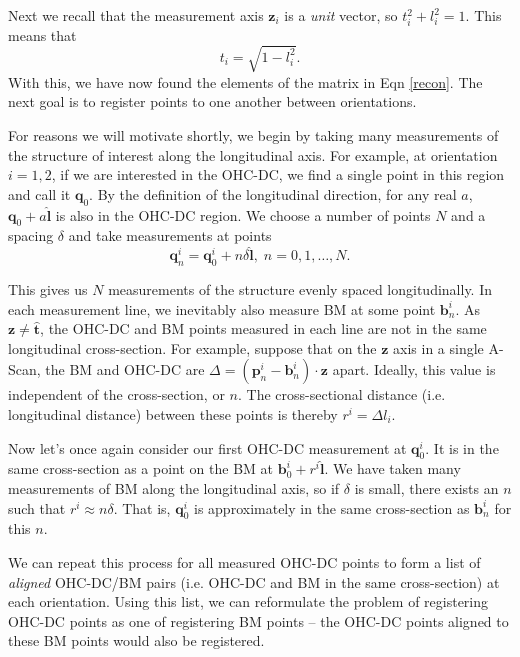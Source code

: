 \documentclass[preprint,NumberedRefs]{JASA}
\begin{document}
\par{Next we recall that the measurement axis $\mathbf{z}_i$ is a \textit{unit} vector, so $t_i^2 + l_i^2 = 1$. This means that
	\begin{equation}
		t_i = \sqrt{1-l_i^2}.
	\end{equation}
	With this, we have now found the elements of the matrix in Eqn \ref{recon}. The next goal is to register points to one another between orientations.
}
\par{For reasons we will motivate shortly, we begin by taking many measurements of the structure of interest along the longitudinal axis. For example, at orientation $i=1,2$, if we are interested in the OHC-DC, we find a single point in this region and call it $\mathbf{q}_0$. By the definition of the longitudinal direction, for any real $a$, $\mathbf{q}_0 + a\mathbf{\hat{l}}$ is also in the OHC-DC region. We choose a number of points $N$ and a spacing $\delta$ and take measurements at points
	\begin{equation}
		\mathbf{q}^i_n = \mathbf{q}^i_0 + n\delta\mathbf{\hat{l}},\;n=0,1,\ldots,N.
	\end{equation}
}
\par{This gives us $N$ measurements of the structure evenly spaced longitudinally. In each measurement line, we inevitably also measure BM at some point $\mathbf{b}^i_n$. As $\mathbf{z}\neq\mathbf{\hat{t}}$, the OHC-DC and BM points measured in each line are not in the same longitudinal cross-section. For example, suppose that on the $\mathbf{z}$ axis in a single A-Scan, the BM and OHC-DC are $\Delta = (\mathbf{p}^i_n-\mathbf{b}^i_n)\cdot\mathbf{z}$ apart. Ideally, this value is independent of the cross-section, or $n$. The cross-sectional distance (i.e. longitudinal distance) between these points is thereby $r^i = \Delta l_i$.}
\par{Now let's once again consider our first OHC-DC measurement at $\mathbf{q}^i_0$. It is in the same cross-section as a point on the BM at $\mathbf{b}^i_0+r^i\mathbf{\hat{l}}$. We have taken many measurements of BM along the longitudinal axis, so if $\delta$ is small, there exists an $n$ such that $r^i \approx n\delta$. That is, $\mathbf{q}^i_0$ is approximately in the same cross-section as $\mathbf{b}^i_n$ for this $n$.}
\par{We can repeat this process for all measured OHC-DC points to form a list of \textit{aligned} OHC-DC/BM pairs (i.e. OHC-DC and BM in the same cross-section) at each orientation. Using this list, we can reformulate the problem of registering OHC-DC points as one of registering BM points -- the OHC-DC points aligned to these BM points would also be registered.}
\end{document}
